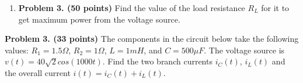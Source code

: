 \begin{enumerate}

\item {\bf Problem 3. (50 points)} 
Find the value of the load resistance $R_L$ for it to get maximum power 
from the voltage source.




\end{enumerate}




\item {\bf Problem 3. (33 points)} 
The components in the circuit below take the following values:
$R_1=1.5\Omega$, $R_2=1\Omega$, $L=1mH$, and $C=500\mu F$. The voltage
source is $v(t)=40\sqrt{2} cos(1000t)$. Find the two branch currents 
$i_C(t)$, $i_L(t)$ and the overall current $i(t)=i_C(t)+i_L(t)$.

